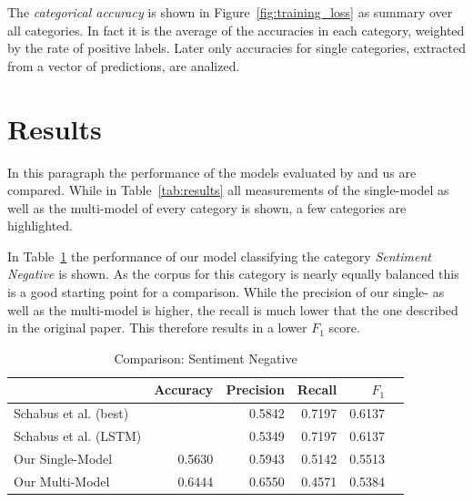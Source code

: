 \documentclass[11pt,a4paper]{article}
\begin{document}
The \textit{categorical accuracy} is shown in Figure~\ref{fig:training_loss} as summary over all categories. In fact it is the average of the accuracies in each category, weighted by the rate of positive labels. Later only accuracies for single categories, extracted from a vector of predictions, are analized.


\section{Results}
In this paragraph the performance of the models evaluated by  and us are compared.
While in Table~\ref{tab:results} all measurements of the single-model as well as the multi-model of every category is shown, a few categories are highlighted.

In Table~\ref{tab:results:sentiment_negative} the performance of our model classifying the category \textit{Sentiment Negative} is shown. As the corpus for this category is nearly equally balanced this is a good starting point for a comparison. While the precision of our single- as well as the multi-model is higher, the recall is much lower that the one described in the original paper. This therefore results in a lower $F_1$ score.
\begin{table}[h!]
	\centering\scriptsize
	\begin{tabular}{l r r r r r}
		& Accuracy & Precision & Recall & $F_1$ \\
		\hline
		Schabus et al. (best) & & 0.5842 & 0.7197 & 0.6137 \\
		Schabus et al. (LSTM) & & 0.5349 & 0.7197 & 0.6137 \\
		\hline
		Our Single-Model & 0.5630 & 0.5943 & 0.5142 & 0.5513\\
		Our Multi-Model & 0.6444 & 0.6550 & 0.4571 & 0.5384 \\
	\end{tabular}  
	\caption{Comparison: Sentiment Negative}
	\label{tab:results:sentiment_negative}
\end{table}
\end{document}
